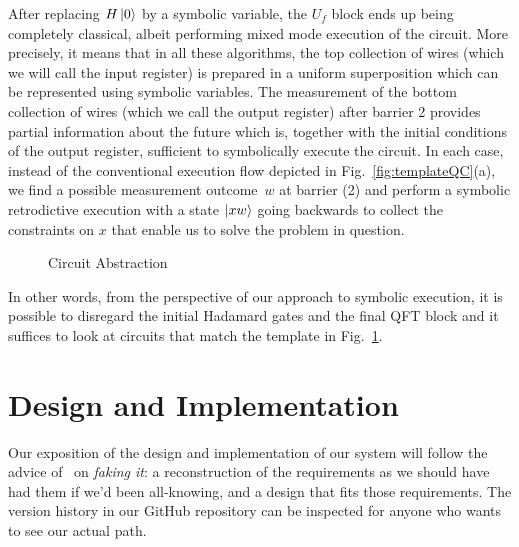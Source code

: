 \documentclass[sigplan,screen]{acmart}
\theoremstyle{definition}
\begin{document}
After replacing $H\ket{0}$ by a symbolic variable, the $U_f$ block
ends up being completely classical, albeit performing mixed mode
execution of the circuit. More precisely, it means that in all these
algorithms, the top collection of wires (which we will call the
input register) is prepared in a uniform superposition which
can be represented using symbolic variables. The measurement of the
bottom collection of wires (which we call the output register) after
barrier 2 provides partial information about the future which is,
together with the initial conditions of the output register,
sufficient to symbolically execute the circuit. In each case, instead
of the conventional execution flow depicted in
Fig.~\ref{fig:templateQC}(a), we find a possible measurement
outcome~$w$ at barrier (2) and perform a symbolic retrodictive
execution with a state $\ket{xw}$ going backwards to collect the
constraints on $x$ that enable us to solve the problem in question.

\begin{figure}[t]
\caption{\label{fig:CircuitAbstraction}Circuit Abstraction}
\end{figure}

In other words, from the perspective of our approach to symbolic
execution, it is possible to disregard the initial Hadamard gates and
the final QFT block and it suffices to look at circuits that match the
template in Fig.~\ref{fig:CircuitAbstraction}.

\section{Design and Implementation}
\label{sec4}

Our exposition of the design and implementation of our system will
follow the advice of~\citet{parnas1986rational} on \emph{faking it}:
a reconstruction of the requirements as we should have had them if
we'd been all-knowing, and a design that fits those requirements. The
version history in our GitHub repository can be inspected for anyone
who wants to see our actual path.
\end{document}
